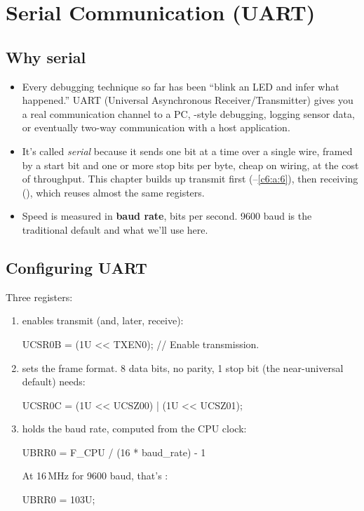 
\section{Serial Communication (UART)}
\label{c6:sec:uart}\label{c6:app:a}

\subsection{Why serial}
\label{c6:a:1}
\begin{itemize}
  \item Every debugging technique so far has been ``blink an LED and infer what happened.'' UART
    (Universal Asynchronous Receiver/Transmitter) gives you a real communication channel to a PC,
    -style debugging, logging sensor data, or eventually two-way communication with
    a host application.
  \item It's called \emph{serial} because it sends one bit at a time over a single wire, framed by
    a start bit and one or more stop bits per byte, cheap on wiring, at the cost of throughput.
    This chapter builds up transmit first (--\ref{c6:a:6}), then receiving
    (), which reuses almost the same registers.
  \item Speed is measured in \textbf{baud rate}, bits per second. 9600 baud is the traditional
    default and what we'll use here.
\end{itemize}

\subsection{Configuring UART}
\label{c6:a:2}
Three registers:
\begin{enumerate}
  \item \textbf{} enables transmit (and, later, receive):

\begin{ccode}
UCSR0B = (1U << TXEN0);   // Enable transmission.
\end{ccode}

  \item \textbf{} sets the frame format. 8 data bits, no parity, 1 stop bit (the
    near-universal default) needs:

\begin{ccode}
UCSR0C = (1U << UCSZ00) | (1U << UCSZ01);
\end{ccode}

  \item \textbf{} holds the baud rate, computed from the CPU clock:

\begin{console}
UBRR0 = F_CPU / (16 * baud_rate) - 1
\end{console}

    \noindent At 16\,MHz for 9600 baud, that's :

\begin{ccode}
UBRR0 = 103U;
\end{ccode}
\end{enumerate}

